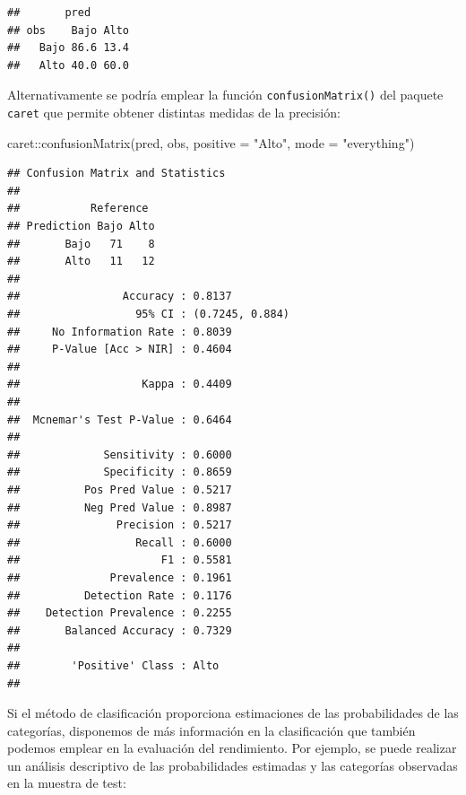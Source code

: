 \documentclass[
]{book}
\newenvironment{Shaded}{\begin{snugshade}}{\end{snugshade}}
\newcommand{\AttributeTok}[1]{\textcolor[rgb]{0.77,0.63,0.00}{#1}}
\newcommand{\FunctionTok}[1]{\textcolor[rgb]{0.00,0.00,0.00}{#1}}
\newcommand{\NormalTok}[1]{#1}
\newcommand{\SpecialCharTok}[1]{\textcolor[rgb]{0.00,0.00,0.00}{#1}}
\newcommand{\StringTok}[1]{\textcolor[rgb]{0.31,0.60,0.02}{#1}}
\theoremstyle{break}
\theoremstyle{definition}
\theoremstyle{definition}
\theoremstyle{definition}
\theoremstyle{definition}
\theoremstyle{remark}
\begin{document}
\begin{verbatim}
##       pred
## obs    Bajo Alto
##   Bajo 86.6 13.4
##   Alto 40.0 60.0
\end{verbatim}

Alternativamente se podría emplear la función \texttt{confusionMatrix()} del paquete \texttt{caret} que permite obtener distintas medidas de la precisión:

\begin{Shaded}
\begin{Highlighting}[]
\NormalTok{caret}\SpecialCharTok{::}\FunctionTok{confusionMatrix}\NormalTok{(pred, obs, }\AttributeTok{positive =} \StringTok{"Alto"}\NormalTok{, }\AttributeTok{mode =} \StringTok{"everything"}\NormalTok{)}
\end{Highlighting}
\end{Shaded}

\begin{verbatim}
## Confusion Matrix and Statistics
## 
##           Reference
## Prediction Bajo Alto
##       Bajo   71    8
##       Alto   11   12
##                                          
##                Accuracy : 0.8137         
##                  95% CI : (0.7245, 0.884)
##     No Information Rate : 0.8039         
##     P-Value [Acc > NIR] : 0.4604         
##                                          
##                   Kappa : 0.4409         
##                                          
##  Mcnemar's Test P-Value : 0.6464         
##                                          
##             Sensitivity : 0.6000         
##             Specificity : 0.8659         
##          Pos Pred Value : 0.5217         
##          Neg Pred Value : 0.8987         
##               Precision : 0.5217         
##                  Recall : 0.6000         
##                      F1 : 0.5581         
##              Prevalence : 0.1961         
##          Detection Rate : 0.1176         
##    Detection Prevalence : 0.2255         
##       Balanced Accuracy : 0.7329         
##                                          
##        'Positive' Class : Alto           
## 
\end{verbatim}

Si el método de clasificación proporciona estimaciones de las probabilidades de las categorías, disponemos de más información en la clasificación que también podemos emplear en la evaluación del rendimiento.
Por ejemplo, se puede realizar un análisis descriptivo de las probabilidades estimadas y las categorías observadas en la muestra de test:
\end{document}
